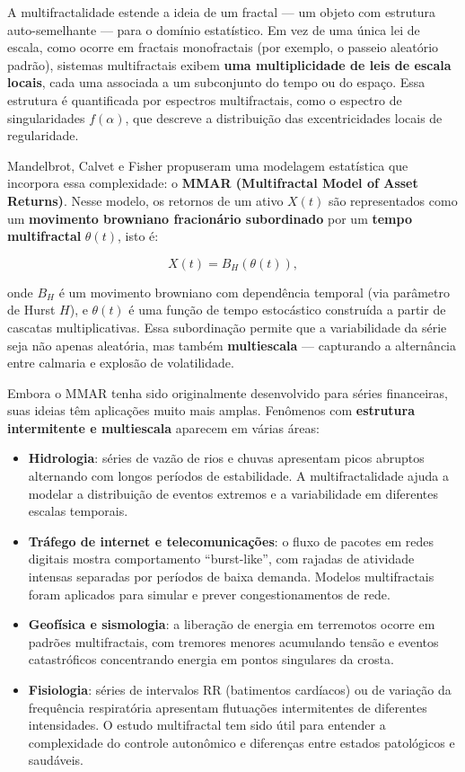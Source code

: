 \documentclass[
  portuguese,
]{agujournal2019}
\providecommand{\tightlist}{%
  \setlength{\itemsep}{0pt}\setlength{\parskip}{0pt}}
\begin{document}
A multifractalidade estende a ideia de um fractal --- um objeto com
estrutura auto-semelhante --- para o domínio estatístico. Em vez de uma
única lei de escala, como ocorre em fractais monofractais (por exemplo,
o passeio aleatório padrão), sistemas multifractais exibem \textbf{uma
multiplicidade de leis de escala locais}, cada uma associada a um
subconjunto do tempo ou do espaço. Essa estrutura é quantificada por
espectros multifractais, como o espectro de singularidades
\(f(\alpha)\), que descreve a distribuição das excentricidades locais de
regularidade.

Mandelbrot, Calvet e Fisher propuseram uma modelagem estatística que
incorpora essa complexidade: o \textbf{MMAR (Multifractal Model of Asset
Returns)}. Nesse modelo, os retornos de um ativo \(X(t)\) são
representados como um \textbf{movimento browniano fracionário
subordinado} por um \textbf{tempo multifractal} \(\theta(t)\), isto é:

\[
X(t) = B_H(\theta(t)),
\]

onde \(B_H\) é um movimento browniano com dependência temporal (via
parâmetro de Hurst \(H\)), e \(\theta(t)\) é uma função de tempo
estocástico construída a partir de cascatas multiplicativas. Essa
subordinação permite que a variabilidade da série seja não apenas
aleatória, mas também \textbf{multiescala} --- capturando a alternância
entre calmaria e explosão de volatilidade.

Embora o MMAR tenha sido originalmente desenvolvido para séries
financeiras, suas ideias têm aplicações muito mais amplas. Fenômenos com
\textbf{estrutura intermitente e multiescala} aparecem em várias áreas:

\begin{itemize}
\tightlist
\item
  \textbf{Hidrologia}: séries de vazão de rios e chuvas apresentam picos
  abruptos alternando com longos períodos de estabilidade. A
  multifractalidade ajuda a modelar a distribuição de eventos extremos e
  a variabilidade em diferentes escalas temporais.
\item
  \textbf{Tráfego de internet e telecomunicações}: o fluxo de pacotes em
  redes digitais mostra comportamento ``burst-like'', com rajadas de
  atividade intensas separadas por períodos de baixa demanda. Modelos
  multifractais foram aplicados para simular e prever congestionamentos
  de rede.
\item
  \textbf{Geofísica e sismologia}: a liberação de energia em terremotos
  ocorre em padrões multifractais, com tremores menores acumulando
  tensão e eventos catastróficos concentrando energia em pontos
  singulares da crosta.
\item
  \textbf{Fisiologia}: séries de intervalos RR (batimentos cardíacos) ou
  de variação da frequência respiratória apresentam flutuações
  intermitentes de diferentes intensidades. O estudo multifractal tem
  sido útil para entender a complexidade do controle autonômico e
  diferenças entre estados patológicos e saudáveis.
\end{itemize}
\end{document}
